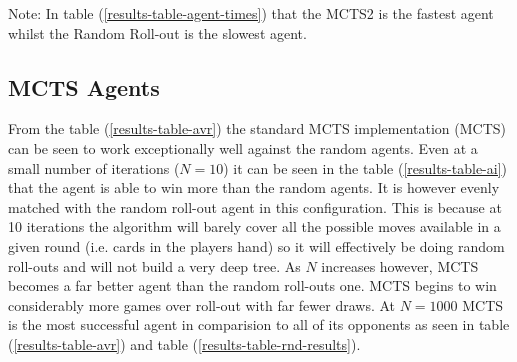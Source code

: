 \documentclass[journal]{IEEEtran}
\begin{document}
\noindent Note: In table (\ref{results-table-agent-times}) that the MCTS2 is the fastest agent whilst the Random Roll-out is the slowest agent.

\subsection{MCTS Agents}
From the table (\ref{results-table-avr}) the standard MCTS implementation (MCTS) can be seen to work exceptionally well against the random agents. Even at a small number of iterations ($N=10$) it can be seen in the table (\ref{results-table-ai}) that the agent is able to win more than the random agents. It is however evenly matched with the random roll-out agent in this configuration. This is because at 10 iterations the algorithm will barely cover all the possible moves available in a given round (i.e. cards in the players hand) so it will effectively be doing random roll-outs and will not build a very deep tree. As $N$ increases however, MCTS becomes a far better agent than the random roll-outs one. MCTS begins to win considerably more games over roll-out with far fewer draws. At $N=1000$ MCTS is the most successful agent in comparision to all of its opponents as seen in table (\ref{results-table-avr}) and table (\ref{results-table-rnd-results}).  \\
\end{document}
